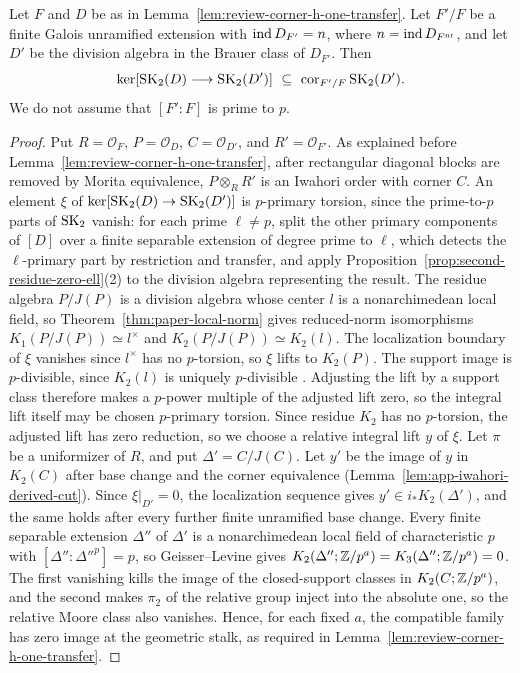 \begin{lemma}\label{lem:second-two-inertial-reduction}
Let $F$ and $D$ be as in Lemma~\ref{lem:review-corner-h-one-transfer}.
Let $F'/F$ be a finite Galois unramified extension with $\operatorname{ind} D_{F'}=n$, where $n=\operatorname{ind} D_{F^{\mathrm{nr}}}$, and let $D'$ be the division algebra in the Brauer class of $D_{F'}$.
Then
\[
 \ker[\operatorname{SK}_2(D)\longrightarrow\operatorname{SK}_2(D')]
 \ \subseteq\ \operatorname{cor}_{F'/F}\operatorname{SK}_2(D').
\]
We do not assume that $[F':F]$ is prime to $p$.
\end{lemma}
\begin{proof}
Put $R=\mathcal O_F$, $P=\mathcal O_D$, $C=\mathcal O_{D'}$, and $R'=\mathcal O_{F'}$.
As explained before Lemma~\ref{lem:review-corner-h-one-transfer}, after rectangular diagonal blocks are removed by Morita equivalence, $P\otimes_RR'$ is an Iwahori order with corner $C$.
An element $\xi$ of $\ker[\operatorname{SK}_2(D)\to\operatorname{SK}_2(D')]$ is $p$-primary torsion, since the prime-to-$p$ parts of $\operatorname{SK}_2$ vanish: for each prime $\ell\ne p$, split the other primary components of $[D]$ over a finite separable extension of degree prime to $\ell$, which detects the $\ell$-primary part by restriction and transfer, and apply Proposition~\ref{prop:second-residue-zero-ell}(2) to the division algebra representing the result.
The residue algebra $P/J(P)$ is a division algebra whose center $l$ is a nonarchimedean local field, so Theorem~\ref{thm:paper-local-norm} gives reduced-norm isomorphisms $K_1(P/J(P))\simeq l^\times$ and $K_2(P/J(P))\simeq K_2(l)$.
The localization boundary of $\xi$ vanishes since $l^\times$ has no $p$-torsion, so $\xi$ lifts to $K_2(P)$.
The support image is $p$-divisible, since $K_2(l)$ is uniquely $p$-divisible \cite{GeisserLevine}.
Adjusting the lift by a support class therefore makes a $p$-power multiple of the adjusted lift zero, so the integral lift itself may be chosen $p$-primary torsion.
Since residue $K_2$ has no $p$-torsion, the adjusted lift has zero reduction, so we choose a relative integral lift $y$ of $\xi$.
Let $\pi$ be a uniformizer of $R$, and put $\Delta'=C/J(C)$.
Let $y'$ be the image of $y$ in $K_2(C)$ after base change and the corner equivalence (Lemma~\ref{lem:app-iwahori-derived-cut}).
Since $\xi|_{D'}=0$, the localization sequence gives $y'\in i_*K_2(\Delta')$, and the same holds after every further finite unramified base change.
Every finite separable extension $\Delta''$ of $\Delta'$ is a nonarchimedean local field of characteristic $p$ with $[\Delta'':\Delta''^p]=p$, so Geisser--Levine gives $K_2(\Delta'';\mathbb Z/p^a)=K_3(\Delta'';\mathbb Z/p^a)=0$.
The first vanishing kills the image of the closed-support classes in $K_2(C;\mathbb Z/p^a)$, and the second makes $\pi_2$ of the relative group inject into the absolute one, so the relative Moore class also vanishes.
Hence, for each fixed $a$, the compatible family has zero image at the geometric stalk, as required in Lemma~\ref{lem:review-corner-h-one-transfer}.


\end{proof}
